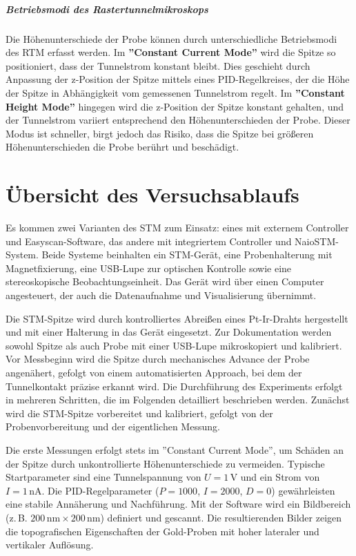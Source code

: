 \paragraph{Betriebsmodi des Rastertunnelmikroskops}

Die Höhenunterschiede der Probe können durch unterschiedliche Betriebsmodi des RTM erfasst werden. Im \textbf{''Constant Current Mode''} wird die Spitze so positioniert, dass der Tunnelstrom konstant bleibt. Dies geschieht durch Anpassung der z-Position der Spitze mittels eines PID-Regelkreises, der die Höhe der Spitze in Abhängigkeit vom gemessenen Tunnelstrom regelt. Im \textbf{''Constant Height Mode''} hingegen wird die z-Position der Spitze konstant gehalten, und der Tunnelstrom variiert entsprechend den Höhenunterschieden der Probe. Dieser Modus ist schneller, birgt jedoch das Risiko, dass die Spitze bei größeren Höhenunterschieden die Probe berührt und beschädigt.

\chapter{Übersicht des Versuchsablaufs}


Es kommen zwei Varianten des STM zum Einsatz: eines mit externem Controller und Easyscan-Software, das andere mit integriertem Controller und NaioSTM-System. Beide Systeme beinhalten ein STM-Gerät, eine Probenhalterung mit Magnetfixierung, eine USB-Lupe zur optischen Kontrolle sowie eine stereoskopische Beobachtungseinheit. Das Gerät wird über einen Computer angesteuert, der auch die Datenaufnahme und Visualisierung übernimmt.

Die STM-Spitze wird durch kontrolliertes Abreißen eines Pt-Ir-Drahts hergestellt und mit einer Halterung in das Gerät eingesetzt. Zur Dokumentation werden sowohl Spitze als auch Probe mit einer USB-Lupe mikroskopiert und kalibriert. Vor Messbeginn wird die Spitze durch mechanisches Advance der Probe angenähert, gefolgt von einem automatisierten Approach, bei dem der Tunnelkontakt präzise erkannt wird.
Die Durchführung des Experiments erfolgt in mehreren Schritten, die im Folgenden detailliert beschrieben werden. Zunächst wird die STM-Spitze vorbereitet und kalibriert, gefolgt von der Probenvorbereitung und der eigentlichen Messung.

Die erste Messungen erfolgt stets im ''Constant Current Mode'', um Schäden an der Spitze durch unkontrollierte Höhenunterschiede zu vermeiden. Typische Startparameter sind eine Tunnelspannung von $U = 1\,\text{V}$ und ein Strom von $I = 1\,\text{nA}$. Die PID-Regelparameter ($P = 1000$, $I = 2000$, $D = 0$) gewährleisten eine stabile Annäherung und Nachführung. Mit der Software wird ein Bildbereich (z.\,B. $200\,\text{nm} \times 200\,\text{nm}$) definiert und gescannt. Die resultierenden Bilder zeigen die topografischen Eigenschaften der Gold-Proben mit hoher lateraler und vertikaler Auflösung.

